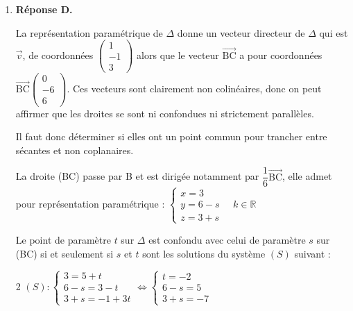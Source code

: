 \documentclass[10pt]{article}
\providecommand{\R}{\mathbb{R}}
\providecommand{\vect}[1]{\overrightarrow{#1}}
\begin{document}
\begin{enumerate}
$\begin{aligned} M_k \in (\mathrm{ABC}) &\iff (8+k) -2(-3-2k) - 2--8-2k)+15=0\\
&\iff 8+k+6+4k+16+4k+15 = 0\\
&\iff 9k + 45 = 0\\
&\iff k = -5\\ \end{aligned}$

H est donc le point $M_{-5}$ qui a comme coordonnées : $(8+(-5)~;~-3-2\times (-5)~;~-8-2\times (-5))$, soit $(3 ~;~ 7 ~;~ 2)$.
	\item \textbf{Réponse D.}

La représentation paramétrique de $\Delta$ donne un vecteur directeur de $\Delta$ qui est $\vect{v}$, de coordonnées $\begin{pmatrix}1\\-1\\3\end{pmatrix}$ alors que le vecteur $\vect{\mathrm{BC}}$ a pour coordonnées $\vect{\mathrm{BC}}\begin{pmatrix}0\\-6\\6\end{pmatrix}$. Ces vecteurs sont clairement non colinéaires, donc on peut affirmer que les droites se sont ni confondues ni strictement parallèles.

Il faut donc déterminer si elles ont un point commun pour trancher entre sécantes et non coplanaires.

La droite (BC) passe par B et est dirigée notamment par $\dfrac{1}{6}\vect{\mathrm{BC}}$, elle admet pour représentation paramétrique : $\left\{\begin{array}{l} x=3\\y=6-s\\z=3+s \end{array}\right. \quad k \in \R$

Le point de paramètre $t$ sur $\Delta$ est confondu avec celui de paramètre $s$ sur (BC) si et seulement si $s$ et $t$ sont les solutions du système $(S)$ suivant :

\setlength{\columnseprule}{0.8pt}
\begin{multicols}{2}
$(S) : \left\{\begin{array}{l} 3 = 5+t\\6-s=3-t\\3+s=-1+3t \end{array}\right.
\iff \left\{\begin{array}{l} t = -2\\6-s=5\\3+s=-7 \end{array}\right.	$


\end{multicols}
\end{enumerate}
\end{document}
